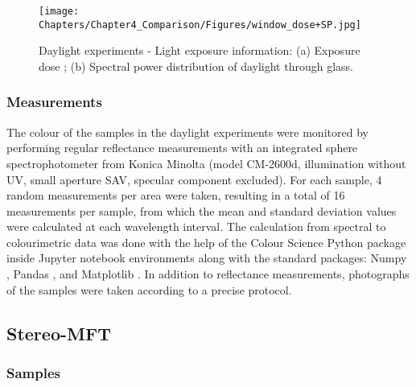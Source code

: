 \vspace{1cm}

\begin{figure*}[!h]
\centering
\texttt{[image: Chapters/Chapter4\_Comparison/Figures/window\_dose+SP.jpg]}
\caption[\hspace{0.3cm}Daylight experiments - Light exposure information]{Daylight experiments - Light exposure information: (a) Exposure dose ; (b) Spectral power distribution of daylight through glass.}
\label{fig:DL_light-exposure_info}
\end{figure*}

\vspace{0.5cm}


\subsubsection{Measurements}

The colour of the samples in the daylight experiments were monitored by performing regular reflectance measurements with an integrated sphere spectrophotometer from Konica Minolta (model CM-2600d, illumination without \gls{UV}, small aperture SAV, specular component excluded). For each sample, 4 random measurements per area were taken, resulting in a total of 16 measurements per sample, from which the mean and standard deviation values were calculated at each wavelength interval. The calculation from spectral to colourimetric data was done with the help of the Colour Science Python package \citep{mansencal_colour_2022} inside Jupyter notebook environments \citep{kluyver_jupyter_2016} along with the standard packages: Numpy \citep{harris_array_2020}, Pandas \citep{mckinney_data_2010}, and Matplotlib \citep{hunter_matplotlib_2007}. In addition to reflectance measurements, photographs of the samples were taken according to a precise protocol.\\


\subsection{Stereo-MFT}

\subsubsection{Samples}

